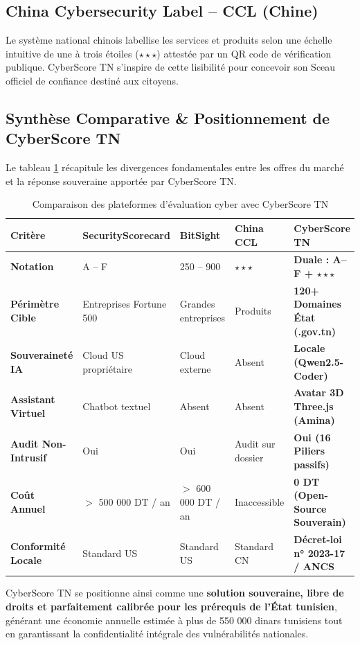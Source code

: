 \subsection{China Cybersecurity Label -- CCL (Chine)}
Le système national chinois labellise les services et produits selon une échelle intuitive de une à trois étoiles ($\star\star\star$) attestée par un QR code de vérification publique. CyberScore TN s'inspire de cette lisibilité pour concevoir son Sceau officiel de confiance destiné aux citoyens.

\subsection{Synthèse Comparative \& Positionnement de CyberScore TN}
Le tableau \ref{tab:benchmark_solutions} récapitule les divergences fondamentales entre les offres du marché et la réponse souveraine apportée par CyberScore TN.

\begin{table}[!htbp]
\centering
\caption{Comparaison des plateformes d'évaluation cyber avec CyberScore TN}
\label{tab:benchmark_solutions}
\begin{singlespace}
\footnotesize
\renewcommand{\arraystretch}{1.12}
\begin{tabularx}{\textwidth}{>{\bfseries}l X X X >{\bfseries}X}
\toprule
\textbf{Critère} & \textbf{SecurityScorecard} & \textbf{BitSight} & \textbf{China CCL} & \textbf{CyberScore TN} \\
\midrule
Notation & A -- F & 250 -- 900 & $\star\star\star$ & Duale : A--F + $\star\star\star$ \\
Périmètre Cible & Entreprises Fortune 500 & Grandes entreprises & Produits & 120+ Domaines État (.gov.tn) \\
Souveraineté IA & Cloud US propriétaire & Cloud externe & Absent & Locale (Qwen2.5-Coder) \\
Assistant Virtuel & Chatbot textuel & Absent & Absent & Avatar 3D Three.js (Amina) \\
Audit Non-Intrusif & Oui & Oui & Audit sur dossier & Oui (16 Piliers passifs) \\
Coût Annuel & $>$ 500 000 DT / an & $>$ 600 000 DT / an & Inaccessible & 0 DT (Open-Source Souverain) \\
Conformité Locale & Standard US & Standard US & Standard CN & Décret-loi n° 2023-17 / ANCS \\
\bottomrule
\end{tabularx}
\end{singlespace}
\end{table}

CyberScore TN se positionne ainsi comme une \textbf{solution souveraine, libre de droits et parfaitement calibrée pour les prérequis de l'État tunisien}, générant une économie annuelle estimée à plus de 550 000 dinars tunisiens tout en garantissant la confidentialité intégrale des vulnérabilités nationales.
